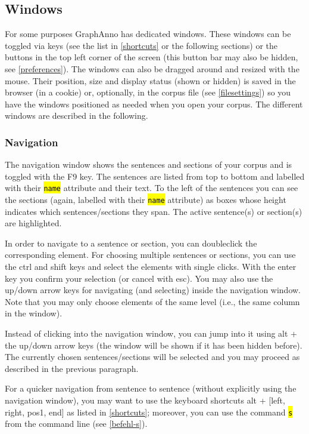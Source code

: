 \documentclass[12pt]{scrartcl}
\newcommand{\code}[1]{\hl{\texttt{#1}}}
\begin{document}
\subsection{Windows}\label{windows}

For some purposes GraphAnno has dedicated windows.
These windows can be toggled via keys (see the list in \ref{shortcuts} or the following sections) or the buttons in the top left corner of the screen (this button bar may also be hidden, see \ref{preferences}).
The windows can also be dragged around and resized with the mouse.
Their position, size and display status (shown or hidden) is saved in the browser (in a cookie) or, optionally, in the corpus file (see \ref{filesettings}) so you have the windows positioned as needed when you open your corpus.
The different windows are described in the following.

\subsubsection{Navigation}\label{window-navigation}

The navigation window shows the sentences and sections of your corpus and is toggled with the F9 key.
The sentences are listed from top to bottom and labelled with their \code{name} attribute and their text.
To the left of the sentences you can see the sections (again, labelled with their \code{name} attribute) as boxes whose height indicates which sentences/sections they span.
The active sentence(s) or section(s) are highlighted.

In order to navigate to a sentence or section, you can doubleclick the corresponding element.
For choosing multiple sentences or sections, you can use the ctrl and shift keys and select the elements with single clicks.
With the enter key you confirm your selection (or cancel with esc).
You may also use the up/down arrow keys for navigating (and selecting) inside the navigation window.
Note that you may only choose elements of the same level (i.e., the same column in the window).

Instead of clicking into the navigation window, you can jump into it using alt + the up/down arrow keys (the window will be shown if it has been hidden before).
The currently chosen sentences/sections will be selected and you may proceed as described in the previous paragraph.

For a quicker navigation from sentence to sentence (without explicitly using the navigation window), you may want to use the keyboard shortcuts alt + [left, right, pos1, end] as listed in \ref{shortcuts}; moreover, you can use the command \code{s} from the command line (see \ref{befehl-s}).
\end{document}
